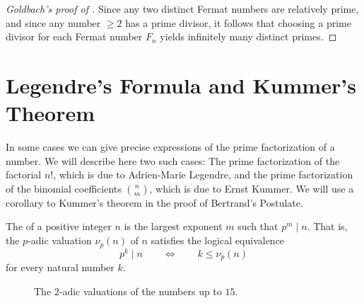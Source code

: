 \begin{proof}[Goldbach's proof of ]
  Since any two distinct Fermat numbers are relatively prime, and since any number $\geq 2$ has a prime divisor, it follows that choosing a prime divisor for each Fermat number $F_n$ yields infinitely many distinct primes.
\end{proof}

\section{Legendre's Formula and Kummer's Theorem}

In some cases we can give precise expressions of the prime factorization of a number. We will describe here two such cases: The prime factorization of the factorial $n!$, which is due to Adrien-Marie Legendre, and the prime factorization of the binomial coefficients $\binom{n}{m}$, which is due to Ernst Kummer. We will use a corollary to Kummer's theorem in the proof of Bertrand's Postulate.

\begin{definition}
  The  of a positive integer $n$ is the largest exponent $m$ such that $p^m\mid n$. That is, the $p$-adic valuation $\nu_p(n)$ of $n$ satisfies the logical equivalence
  \begin{equation*}
    p^k\mid n\qquad\Leftrightarrow\qquad k\leq \nu_p(n)
  \end{equation*}
  for every natural number $k$.
\end{definition}

\begin{figure}[t]
  \centering
  \caption[The $2$-adic valuations of the numbers up to $15$]{The $2$-adic valuations of the numbers up to $15$.}
  \label{figure:2-adic-valuation}
\end{figure}

